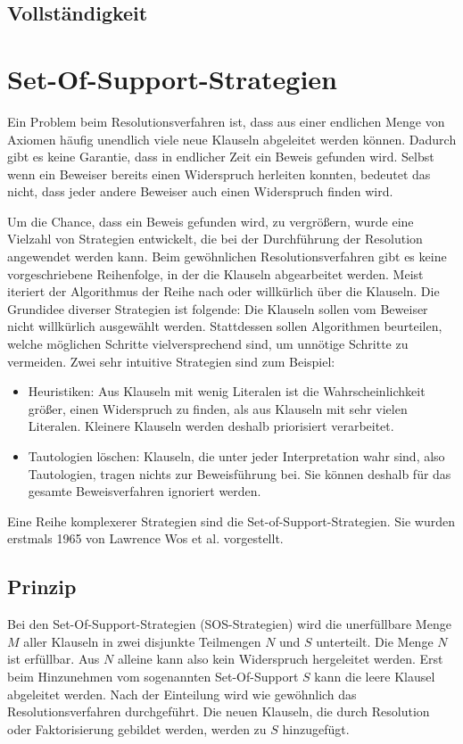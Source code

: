 		\subsection{Vollständigkeit}
	
	\section{Set-Of-Support-Strategien}
Ein Problem beim Resolutionsverfahren ist, dass aus einer endlichen Menge von Axiomen häufig unendlich viele neue Klauseln abgeleitet werden können. Dadurch gibt es keine Garantie, dass in endlicher Zeit ein Beweis gefunden wird. Selbst wenn ein Beweiser bereits einen Widerspruch herleiten konnten, bedeutet das nicht, dass jeder andere Beweiser auch einen Widerspruch finden wird.

Um die Chance, dass ein Beweis gefunden wird, zu vergrößern, wurde eine Vielzahl von Strategien entwickelt, die bei der Durchführung der Resolution angewendet werden kann. Beim gewöhnlichen Resolutionsverfahren gibt es keine vorgeschriebene Reihenfolge, in der die Klauseln abgearbeitet werden. Meist iteriert der Algorithmus der Reihe nach oder willkürlich über die Klauseln. Die Grundidee diverser Strategien ist folgende: Die Klauseln sollen vom Beweiser nicht willkürlich ausgewählt werden. Stattdessen sollen Algorithmen beurteilen, welche möglichen Schritte vielversprechend sind, um unnötige Schritte zu vermeiden. Zwei sehr intuitive Strategien sind zum Beispiel:
\begin{itemize}
	\item Heuristiken: Aus Klauseln mit wenig Literalen ist die Wahrscheinlichkeit größer, einen Widerspruch zu finden, als aus Klauseln mit sehr vielen Literalen. Kleinere Klauseln werden deshalb priorisiert verarbeitet.
	\item Tautologien löschen: Klauseln, die unter jeder Interpretation wahr sind, also Tautologien, tragen nichts zur Beweisführung bei. Sie können deshalb für das gesamte Beweisverfahren ignoriert werden.
\end{itemize}

Eine Reihe komplexerer Strategien sind die Set-of-Support-Strategien. Sie wurden erstmals 1965 von Lawrence Wos et al. vorgestellt. \cite{Wos1965Sos}

		\subsection{Prinzip}
Bei den Set-Of-Support-Strategien (SOS-Strategien) wird die unerfüllbare Menge $M$ aller Klauseln in zwei disjunkte Teilmengen $N$ und $S$ unterteilt. Die Menge $N$ ist erfüllbar. Aus $N$ alleine kann also kein Widerspruch hergeleitet werden. Erst beim Hinzunehmen vom sogenannten Set-Of-Support $S$ kann die leere Klausel abgeleitet werden. Nach der Einteilung wird wie gewöhnlich das Resolutionsverfahren durchgeführt. Die neuen Klauseln, die durch Resolution oder Faktorisierung gebildet werden, werden zu $S$ hinzugefügt. 

